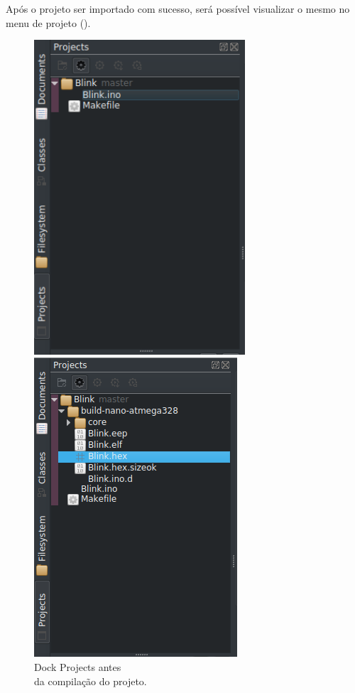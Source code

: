 Após o projeto ser importado com sucesso, será possível visualizar o mesmo no menu de projeto ().

\begin{figure}[!htb]
  \begin{minipage}[t]{0.5\textwidth}
  \includegraphics[width=0.7\textwidth]{figuras/projects.png}
  \caption[Projects antes da compilação]{Dock Projects antes\\ da compilação do projeto.}
  \label{fig:projects}
  \end{minipage}%
  \begin{minipage}[t]{0.5\textwidth}
  \includegraphics[width=0.713\linewidth]{figuras/projects2.png}

\end{minipage}
\end{figure}
